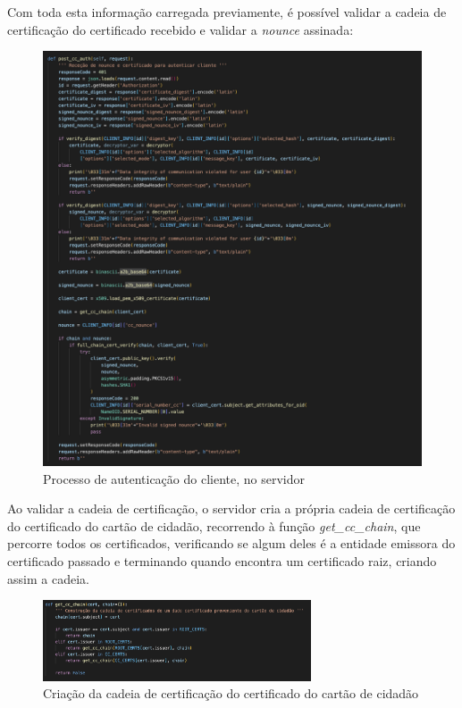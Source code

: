 \documentclass[10pt,english]{article}
\begin{document}
\clearpage

\par Com toda esta informação carregada previamente, é possível validar a cadeia de certificação do certificado recebido e validar a \textit{nounce} assinada:

\begin{figure}[!h]
        \centering
        \includegraphics[width=\textwidth]{images/post_cc_auth_server.png}
        \caption{Processo de autenticação do cliente, no servidor}
\end{figure}

\par Ao validar a cadeia de certificação, o servidor cria a própria cadeia de certificação do certificado do cartão de cidadão, recorrendo à função \textit{get\_cc\_chain}, que percorre todos os certificados, verificando se algum deles é a entidade emissora do certificado passado e terminando quando encontra um certificado raiz, criando assim a cadeia.

\begin{figure}[!h]
        \centering
        \includegraphics[width=300]{images/get_cc_chain.png}
        \caption{Criação da cadeia de certificação do certificado do cartão de cidadão}
\end{figure}
\end{document}
